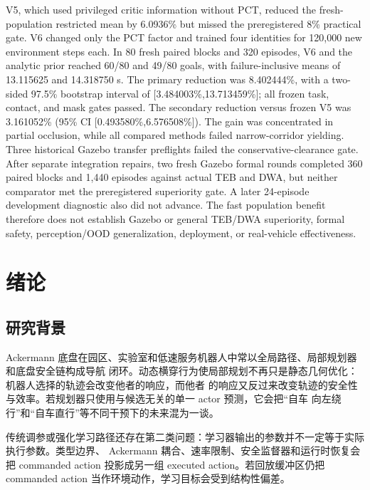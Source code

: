 \documentclass[12pt,a4paper,oneside]{report}
\begin{document}
V5, which used privileged critic information without PCT, reduced the fresh-population restricted
mean by 6.0936\% but missed the preregistered 8\% practical gate. V6 changed only the PCT factor and
trained four identities for 120,000 new environment steps each. In 80 fresh paired blocks and 320
episodes, V6 and the analytic prior reached 60/80 and 49/80 goals, with failure-inclusive means of
13.115625 and 14.318750 s. The primary reduction was 8.402444\%, with a two-sided 97.5\% bootstrap
interval of [3.484003\%,13.713459\%]; all frozen task, contact, and mask gates passed. The
secondary reduction versus frozen V5 was 3.161052\% (95\% CI [0.493580\%,6.576508\%]). The gain was
concentrated in partial occlusion, while all compared methods failed narrow-corridor yielding.
Three historical Gazebo transfer preflights failed the conservative-clearance gate. After
separate integration repairs, two fresh Gazebo formal rounds completed 360 paired blocks and
1,440 episodes against actual TEB and DWA, but neither comparator met the preregistered
superiority gate. A later 24-episode development diagnostic also did not advance. The fast
population benefit therefore does not establish Gazebo or general TEB/DWA superiority,
formal safety, perception/OOD generalization, deployment, or real-vehicle effectiveness.

\tableofcontents
\listoftables
\listoffigures
\clearpage
{}

\chapter{绪论}
\section{研究背景}
Ackermann 底盘在园区、实验室和低速服务机器人中常以全局路径、局部规划器和底盘安全链构成导航
闭环。动态横穿行为使局部规划不再只是静态几何优化：机器人选择的轨迹会改变他者的响应，而他者
的响应又反过来改变轨迹的安全性与效率。若规划器只使用与候选无关的单一 actor 预测，它会把“自车
向左绕行”和“自车直行”等不同干预下的未来混为一谈。

传统调参或强化学习路径还存在第二类问题：学习器输出的参数并不一定等于实际执行参数。类型边界、
Ackermann 耦合、速率限制、安全监督器和运行时恢复会把 commanded action 投影成另一组 executed
action。若回放缓冲区仍把 commanded action 当作环境动作，学习目标会受到结构性偏差。
\end{document}
